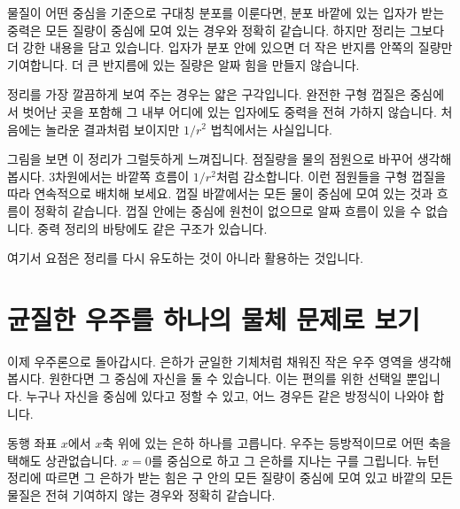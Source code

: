 물질이 어떤 중심을 기준으로 구대칭 분포를 이룬다면, 분포 바깥에 있는 입자가 받는 중력은 모든 질량이 중심에 모여 있는 경우와 정확히 같습니다. 하지만 정리는 그보다 더 강한 내용을 담고 있습니다. 입자가 분포 안에 있으면 더 작은 반지름 안쪽의 질량만 기여합니다. 더 큰 반지름에 있는 질량은 알짜 힘을 만들지 않습니다.

정리를 가장 깔끔하게 보여 주는 경우는 얇은 구각입니다. 완전한 구형 껍질은 중심에서 벗어난 곳을 포함해 그 내부 어디에 있는 입자에도 중력을 전혀 가하지 않습니다. 처음에는 놀라운 결과처럼 보이지만 \(1/r^2\) 법칙에서는 사실입니다.

\begin{classroomqa}
\end{classroomqa}

그림을 보면 이 정리가 그럴듯하게 느껴집니다. 점질량을 물의 점원으로 바꾸어 생각해 봅시다. 3차원에서는 바깥쪽 흐름이 \(1/r^2\)처럼 감소합니다. 이런 점원들을 구형 껍질을 따라 연속적으로 배치해 보세요. 껍질 바깥에서는 모든 물이 중심에 모여 있는 것과 흐름이 정확히 같습니다. 껍질 안에는 중심에 원천이 없으므로 알짜 흐름이 있을 수 없습니다. 중력 정리의 바탕에도 같은 구조가 있습니다.

여기서 요점은 정리를 다시 유도하는 것이 아니라 활용하는 것입니다.

\section{균질한 우주를 하나의 물체 문제로 보기}

이제 우주론으로 돌아갑시다. 은하가 균일한 기체처럼 채워진 작은 우주 영역을 생각해 봅시다. 원한다면 그 중심에 자신을 둘 수 있습니다. 이는 편의를 위한 선택일 뿐입니다. 누구나 자신을 중심에 있다고 정할 수 있고, 어느 경우든 같은 방정식이 나와야 합니다.

동행 좌표 \(x\)에서 \(x\)축 위에 있는 은하 하나를 고릅니다. 우주는 등방적이므로 어떤 축을 택해도 상관없습니다. \(x=0\)를 중심으로 하고 그 은하를 지나는 구를 그립니다. 뉴턴 정리에 따르면 그 은하가 받는 힘은 구 안의 모든 질량이 중심에 모여 있고 바깥의 모든 물질은 전혀 기여하지 않는 경우와 정확히 같습니다.

